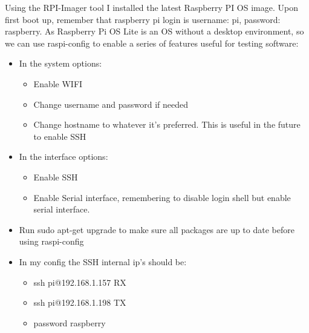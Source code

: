 \documentclass[a4paper,11pt]{scrartcl}
\begin{document}
Using the RPI-Imager tool I installed the latest Raspberry PI OS image. Upon first boot up, remember that raspberry pi login is username: pi, password: raspberry. As Raspberry Pi OS Lite is an OS without a desktop environment, so we can use raspi-config to enable a series of features useful for testing software:
\begin{itemize}    
    \item In the system options:
    \begin{itemize}
        \item Enable WIFI
        \item Change username and password if needed
        \item Change hostname to whatever it's preferred. This is useful in the future to enable SSH
    \end{itemize}
    \item In the interface options:
    \begin{itemize}
        \item Enable SSH
        \item Enable Serial interface, remembering to disable login shell but enable serial interface.
    \end{itemize}
    \item Run sudo apt-get upgrade to make sure all packages are up to date before using raspi-config
    \item In my config the SSH internal ip's should be:
    \begin{itemize}
        \item ssh pi@192.168.1.157 RX
        \item ssh pi@192.168.1.198 TX
        \item password raspberry
    \end{itemize}
\end{itemize}
\end{document}
